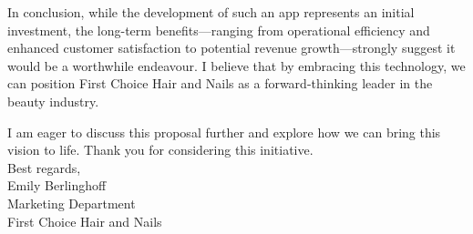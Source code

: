 \documentclass[12pt]{article}
\begin{document}
In conclusion, while the development of such an app represents an initial investment, the long-term benefits—ranging from operational efficiency and enhanced customer satisfaction to potential revenue growth—strongly suggest it would be a worthwhile endeavour. I believe that by embracing this technology, we can position First Choice Hair and Nails as a forward-thinking leader in the beauty industry.

I am eager to discuss this proposal further and explore how we can bring this vision to life. Thank you for considering this initiative.\\

Best regards,\\

Emily Berlinghoff\\
Marketing Department\\
First Choice Hair and Nails
\end{document}
